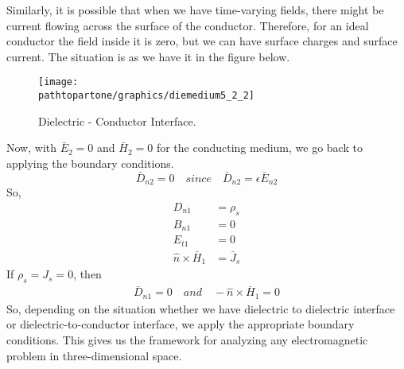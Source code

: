 Similarly, it is possible that when we have time-varying fields, there might be current flowing across the surface of the conductor. Therefore, for an ideal conductor the field inside it is zero, but we can have surface charges and surface current. The situation is as we have it in the figure below.
\begin{figure}[h]
\centering
\texttt{[image: \\pathtopartone/graphics/diemedium5\_2\_2]}
\caption{Dielectric - Conductor Interface.}
\end{figure}

Now, with $\bar{E}_2 = 0$ and $\bar{H}_2 = 0$ for the conducting medium, we go back to applying the boundary conditions.
\begin{equation*}
\bar{D}_{n2} = 0\quad since\quad \bar{D}_{n2} = \epsilon\bar{E}_{n2}
\end{equation*}
So,
\begin{align*}
D_{n1} &= \rho_s \\
B_{n1} &= 0 \\
E_{t1} &= 0 \\
\hat{n}\times\bar{H}_1 &= \bar{J}_s
\end{align*}
If $\rho_s = J_s = 0$, then
\begin{align*}
\bar{D}_{n1} = 0\quad and \quad -\hat{n}\times\bar{H}_{1} = 0
\end{align*}
So, depending on the situation whether we have dielectric to dielectric interface or dielectric-to-conductor interface, we apply the appropriate boundary conditions. This gives us the framework for analyzing any electromagnetic problem in three-dimensional space. 

